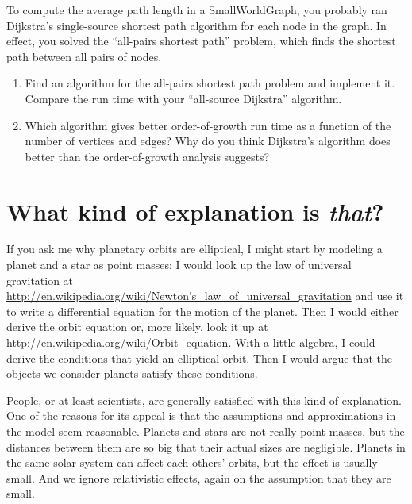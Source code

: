 \documentclass[10pt]{book}
\begin{document}
\begin{exercise}

To compute the average path length in a SmallWorldGraph, you
probably ran Dijkstra's single-source shortest path algorithm
for each node in the graph.  In effect, you solved the
``all-pairs shortest path'' problem, which finds the shortest path
between all pairs of nodes.

\begin{enumerate}

\item Find an algorithm for the all-pairs shortest path problem
and implement it.  Compare the run time with your
``all-source Dijkstra'' algorithm.

\item Which algorithm gives better order-of-growth run time
as a function of the number of vertices and edges?  Why do you
think Dijkstra's algorithm does better than the order-of-growth
analysis suggests?

\end{enumerate}

\end{exercise}


\section{What kind of explanation is {\em that}?}

If you ask me why planetary orbits are elliptical,
I might start by modeling a planet and a star as point masses; I
would look up the law of universal gravitation at
\url{http://en.wikipedia.org/wiki/Newton's_law_of_universal_gravitation}
and use it to write a differential equation for the motion of
the planet.  Then I would either derive the orbit equation or,
more likely, look it up at \url{http://en.wikipedia.org/wiki/Orbit_equation}.
With a little algebra, I could derive the conditions that
yield an elliptical orbit.  Then I would argue that the objects
we consider planets satisfy these conditions.

People, or at least scientists, are generally satisfied with
this kind of explanation.  One of the reasons for its appeal
is that the assumptions and approximations in the model seem
reasonable.  Planets and stars are not really point masses,
but the distances between them are so big that their actual
sizes are negligible.  Planets in the same solar system can
affect each others' orbits, but the effect is usually small.
And we ignore relativistic effects, again on the assumption that
they are small.
\end{document}
